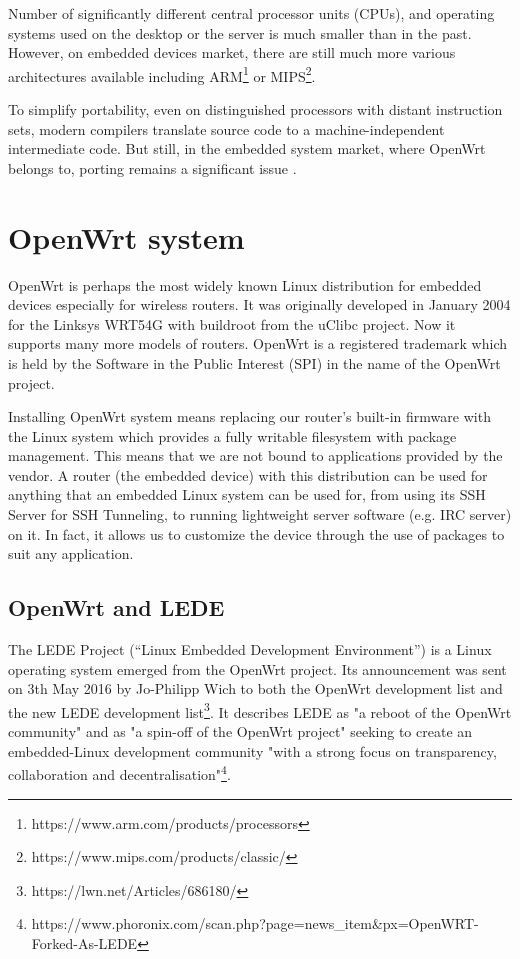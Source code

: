 Number of significantly different central processor units (CPUs), and operating systems used on the desktop or the server is much smaller than in the past.
However, on embedded devices market, there are still much more various architectures available including ARM\footnote{https://www.arm.com/products/processors} or MIPS\footnote{https://www.mips.com/products/classic/}.

To simplify portability, even on distinguished processors with distant instruction sets, modern compilers translate source code to a machine-independent intermediate code.
But still, in the embedded system market, where OpenWrt belongs to, porting remains a significant issue \cite{porting_software}.



\section{OpenWrt system}\label{owrt}
OpenWrt is perhaps the most widely known Linux distribution for embedded devices especially for wireless routers.
It was originally developed in January 2004 for the Linksys WRT54G with buildroot from the uClibc project.
Now it supports many more models of routers.
OpenWrt is a registered trademark which is held by the Software in the Public Interest (SPI) in the name of the OpenWrt project.

Installing OpenWrt system means replacing our router’s built-in firmware with the Linux system which provides a fully writable filesystem with package management.
This means that we are not bound to applications provided by the vendor.
A router (the embedded device) with this distribution can be used for anything that an embedded Linux system can be used for, from using its SSH Server for SSH Tunneling, to running lightweight server software (e.g. IRC server) on it.
In fact, it allows us to customize the device through the use of packages to suit any application. \cite{openwrt}



\subsection{OpenWrt and LEDE}

The LEDE Project (“Linux Embedded Development Environment”) is a Linux operating system emerged from the OpenWrt project.
Its announcement was sent on 3th May 2016 by Jo-Philipp Wich to both the OpenWrt development list and the new LEDE development list\footnote{https://lwn.net/Articles/686180/}.
It describes LEDE as "a reboot of the OpenWrt community" and as "a spin-off of the OpenWrt project" seeking to create an embedded-Linux development community "with a strong focus on transparency, collaboration and decentralisation"\footnote{https://www.phoronix.com/scan.php?page=news\_item\&px=OpenWRT-Forked-As-LEDE}.

